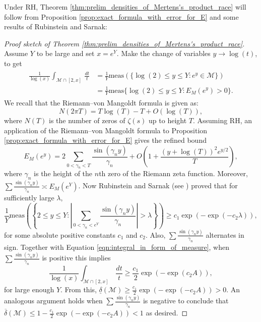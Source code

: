 \documentclass[12pt,reqno]{amsart}
\theoremstyle{definition}
\numberwithin{equation}{section}
\begin{document}
    Under RH, Theorem \ref{thm:prelim_densities_of_Mertens's_product_race} will follow from Proposition \ref{prop:exact_formula_with_error_for_E} and some results of Rubinstein and Sarnak:

    \begin{proof}[Proof sketch of Theorem \ref{thm:prelim_densities_of_Mertens's_product_race}]
        Assume $Y$ to be large and set $x = e^{Y}$. Make the change of variables $y \to \log(t)$, to get 
        \begin{align}
            \begin{split}\label{eqn:integral_in_form_of_measure}
                    \frac{1}{\log(x)} \int_{\mathcal{M}\cap [2,x]}\,\frac{dt}{t} &= \frac{1}{Y}\mathrm{meas}(\{ \log(2) \leq y \leq Y : e^{y} \in \mathcal{M}\})
                \\ & =  \frac{1}{Y}\mathrm{meas}\{\log(2) \leq y \leq Y : E_M(e^{y})>0\}.
            \end{split}
        \end{align}
       We recall that the Riemann--von Mangoldt formula is given as:
        \[
            N(2\pi T) = T\log(T)-T+O(\log(T)),
        \]
        where $N(T)$ is the number of zeros of $\zeta(s)$ up to height $T$. Assuming RH, an application of the Riemann--von Mangoldt formula to Proposition \ref{prop:exact_formula_with_error_for_E} gives the refined bound
        \[
            E_{M}(e^{y}) = 2\sum_{0 < \gamma_{n} < T}\frac{\sin(\gamma_{n}y)}{\gamma_{n}}+O\left(1+\frac{(y+\log(T))^{2}e^{y/2}}{T}\right),
        \]
        where $\gamma_{n}$ is the height of the $n$th zero of the Riemann zeta function. Moreover, $\sum\frac{\sin(\gamma_{n}y)}{\gamma_{n}} \asymp E_{M}(e^{Y})$. Now Rubinstein and Sarnak (see \cite{RS}) proved that for sufficiently large $\lambda$,
        \[
            \frac{1}{Y}\mathrm{meas}\left(\left\{2 \le y \le Y:\left|\sum_{0 < \gamma_n < e^{Y}} \frac{\sin(\gamma_{n}y)}{\gamma_{n}}\right| > \lambda \right\}\right) \ge c_{1}\exp(-\exp(-c_{2}\lambda)),
        \]
        for some absolute positive constants $c_{1}$ and $c_{2}$. Also, $\sum\frac{\sin(\gamma_{n}y)}{\gamma_{n}}$ alternates in sign. Together with Equation \ref{eqn:integral_in_form_of_measure}, when $\sum\frac{\sin(\gamma_{n}y)}{\gamma_{n}}$ is positive this implies
        \[
            \frac{1}{\log(x)} \int_{\mathcal{M}\cap [2,x]}\,\frac{dt}{t} \ge \frac{c_{1}}{2}\exp(-\exp(c_{2}A)),
        \]
        for large enough $Y$. From this, $\underline{\delta}(\mathcal{M}) \ge \frac{c_{1}}{2}\exp(-\exp(-c_{2}A)) > 0$. An analogous argument holds when $\sum\frac{\sin(\gamma_{n}y)}{\gamma_{n}}$ is negative to conclude that $\overline{\delta}(\mathcal{M}) \le 1- \frac{c_{1}}{2}\exp(-\exp(-c_{2}A)) < 1$ as desired.
 \end{proof}
\end{document}
